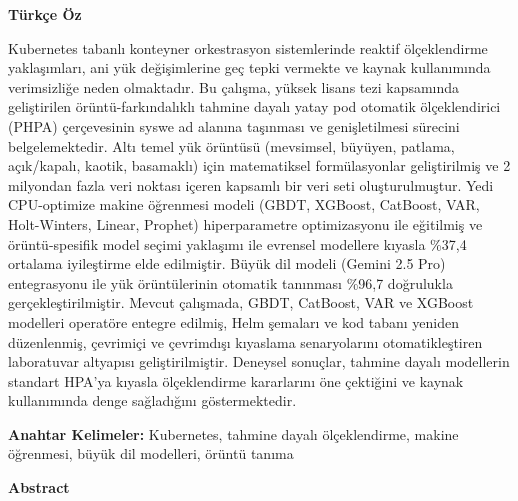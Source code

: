 \documentclass[12pt,a4paper]{article}
\begin{document}
\vspace{1cm}

\noindent
\textbf{Türkçe Öz}

\noindent
Kubernetes tabanlı konteyner orkestrasyon sistemlerinde reaktif ölçeklendirme yaklaşımları, ani yük değişimlerine geç tepki vermekte ve kaynak kullanımında verimsizliğe neden olmaktadır. Bu çalışma, yüksek lisans tezi kapsamında geliştirilen örüntü-farkındalıklı tahmine dayalı yatay pod otomatik ölçeklendirici (PHPA) çerçevesinin syswe ad alanına taşınması ve genişletilmesi sürecini belgelemektedir. Altı temel yük örüntüsü (mevsimsel, büyüyen, patlama, açık/kapalı, kaotik, basamaklı) için matematiksel formülasyonlar geliştirilmiş ve 2 milyondan fazla veri noktası içeren kapsamlı bir veri seti oluşturulmuştur. Yedi CPU-optimize makine öğrenmesi modeli (GBDT, XGBoost, CatBoost, VAR, Holt-Winters, Linear, Prophet) hiperparametre optimizasyonu ile eğitilmiş ve örüntü-spesifik model seçimi yaklaşımı ile evrensel modellere kıyasla \%37,4 ortalama iyileştirme elde edilmiştir. Büyük dil modeli (Gemini 2.5 Pro) entegrasyonu ile yük örüntülerinin otomatik tanınması \%96,7 doğrulukla gerçekleştirilmiştir. Mevcut çalışmada, GBDT, CatBoost, VAR ve XGBoost modelleri operatöre entegre edilmiş, Helm şemaları ve kod tabanı yeniden düzenlenmiş, çevrimiçi ve çevrimdışı kıyaslama senaryolarını otomatikleştiren laboratuvar altyapısı geliştirilmiştir. Deneysel sonuçlar, tahmine dayalı modellerin standart HPA'ya kıyasla ölçeklendirme kararlarını öne çektiğini ve kaynak kullanımında denge sağladığını göstermektedir.

\vspace{0.5cm}

\noindent
\textbf{Anahtar Kelimeler:} Kubernetes, tahmine dayalı ölçeklendirme, makine öğrenmesi, büyük dil modelleri, örüntü tanıma

\vspace{1cm}

\noindent
\textbf{Abstract}
\end{document}
